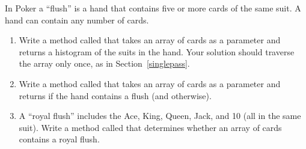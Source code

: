 \begin{exercise}  %

In Poker a ``flush'' is a hand that contains five or more cards of the same suit.
A hand can contain any number of cards.


\begin{enumerate}

\item Write a method called  that takes an array of cards as a parameter and returns a histogram of the suits in the hand.
Your solution should traverse the array only once, as in Section~\ref{singlepass}.

\item Write a method called  that takes an array of cards as a parameter and returns  if the hand contains a flush (and  otherwise).

\item A ``royal flush'' includes the Ace, King, Queen, Jack, and 10 (all in the same suit). Write a method called  that determines whether an array of cards contains a royal flush.

\end{enumerate}
\vspace{0pt}

\end{exercise}


